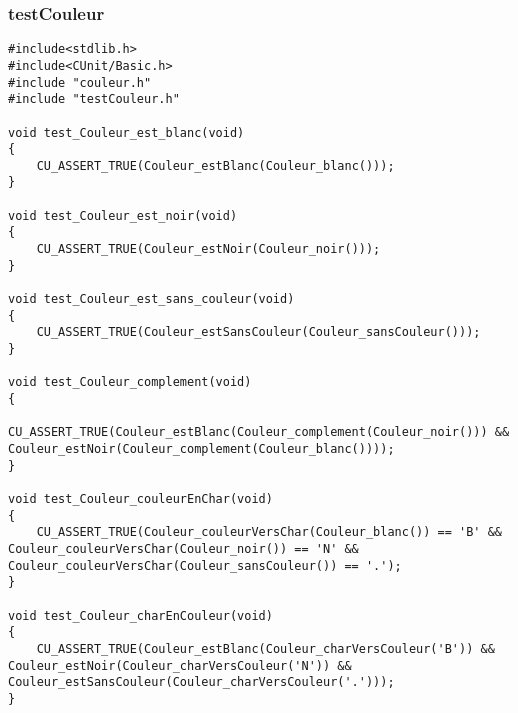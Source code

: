 \subsubsection{testCouleur}
\usepackage[T1]{fontenc}
\usepackage[english]{babel}
\usepackage{fullpage}
\usepackage{color}
\usepackage[table]{xcolor}
\usepackage{listings}
 
 
 

 
\begin{lstlisting}
#include<stdlib.h>
#include<CUnit/Basic.h>
#include "couleur.h"
#include "testCouleur.h"

void test_Couleur_est_blanc(void)
{
	CU_ASSERT_TRUE(Couleur_estBlanc(Couleur_blanc()));
}

void test_Couleur_est_noir(void)
{
	CU_ASSERT_TRUE(Couleur_estNoir(Couleur_noir()));
}

void test_Couleur_est_sans_couleur(void)
{
	CU_ASSERT_TRUE(Couleur_estSansCouleur(Couleur_sansCouleur()));
}

void test_Couleur_complement(void)
{
	CU_ASSERT_TRUE(Couleur_estBlanc(Couleur_complement(Couleur_noir())) && Couleur_estNoir(Couleur_complement(Couleur_blanc())));
}

void test_Couleur_couleurEnChar(void)
{
	CU_ASSERT_TRUE(Couleur_couleurVersChar(Couleur_blanc()) == 'B' && Couleur_couleurVersChar(Couleur_noir()) == 'N' && Couleur_couleurVersChar(Couleur_sansCouleur()) == '.');
}

void test_Couleur_charEnCouleur(void)
{
	CU_ASSERT_TRUE(Couleur_estBlanc(Couleur_charVersCouleur('B')) && Couleur_estNoir(Couleur_charVersCouleur('N')) && Couleur_estSansCouleur(Couleur_charVersCouleur('.')));
}
\end{lstlisting}
 
